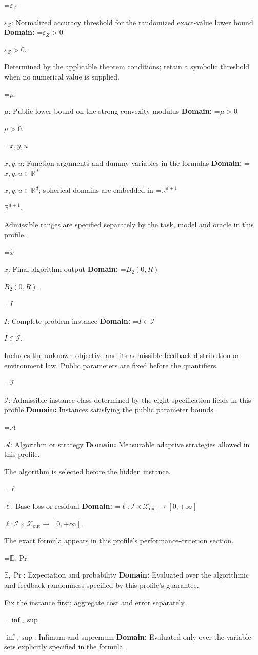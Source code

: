 \documentclass[10pt,a4paper]{article}
\newcommand{\AtlasMath}[1]{\par\begingroup\centering\setbox0=\hbox{$\displaystyle #1$}\ifdim\wd0>1.4\linewidth\typeout{ATLAS WIDE FORMULA: \the\wd0}\fi\ifdim\wd0>\linewidth\resizebox{\linewidth}{!}{\box0}\else\box0\fi\par\endgroup}
\newcommand{\AtlasInlineMath}[1]{\begingroup\setbox0=\hbox{$#1$}\ifdim\wd0>.4\linewidth\endgroup\AtlasMath{#1}\else\endgroup$#1$\fi}
\begin{document}
\AtlasInlineMath{\varepsilon_Z}: Normalized accuracy threshold for the randomized exact-value lower bound \textbf{Domain:} \AtlasInlineMath{\varepsilon_Z>0}.

Determined by the applicable theorem conditions; retain a symbolic threshold when no numerical value is supplied.

\AtlasInlineMath{\mu}: Public lower bound on the strong-convexity modulus \textbf{Domain:} \AtlasInlineMath{\mu>0}.

\AtlasInlineMath{x,y,u}: Function arguments and dummy variables in the formulas \textbf{Domain:} \AtlasInlineMath{x,y,u\in\mathbb{R}^d}; spherical domains are embedded in \AtlasInlineMath{\mathbb{R}^{d+1}}.

Admissible ranges are specified separately by the task, model and oracle in this profile.

\AtlasInlineMath{\widehat{x}}: Final algorithm output \textbf{Domain:} \AtlasInlineMath{B_2(0,R)}.

\AtlasInlineMath{I}: Complete problem instance \textbf{Domain:} \AtlasInlineMath{I\in\mathcal{I}}.

Includes the unknown objective and its admissible feedback distribution or environment law. Public parameters are fixed before the quantifiers.

\AtlasInlineMath{\mathcal{I}}: Admissible instance class determined by the eight specification fields in this profile \textbf{Domain:} Instances satisfying the public parameter bounds.

\AtlasInlineMath{\mathcal{A}}: Algorithm or strategy \textbf{Domain:} Measurable adaptive strategies allowed in this profile.

The algorithm is selected before the hidden instance.

\AtlasInlineMath{\ell}: Base loss or residual \textbf{Domain:} \AtlasInlineMath{\ell:\mathcal{I}\times\mathcal{X}_{\mathrm{out}}\to[0,+\infty]}.

The exact formula appears in this profile's performance-criterion section.

\AtlasInlineMath{\mathbb{E},\Pr}: Expectation and probability \textbf{Domain:} Evaluated over the algorithmic and feedback randomness specified by this profile's guarantee.

Fix the instance first; aggregate cost and error separately.

\AtlasInlineMath{\inf,\sup}: Infimum and supremum \textbf{Domain:} Evaluated only over the variable sets explicitly specified in the formula.
\end{document}
